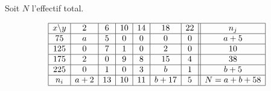 \documentclass[12pt,a4paper]{article}
\begin{document}
\vspace{0.2cm}

Soit \( N \) l’effectif total.

\vspace{0.4cm}

\[
\begin{array}{|c|c|c|c|c|c|c||c|}
\hline
x \backslash y & 2 & 6 & 10 & 14 & 18 & 22 & n_j \\
\hline
75 & a & 5 & 0 & 0 & 0 & 0 & a+5 \\
\hline
125 & 0 & 7 & 1 & 0 & 2 & 0 & 10 \\
\hline
175 & 2 & 0 & 9 & 8 & 15 & 4 & 38 \\
\hline
225 & 0 & 1 & 0 & 3 & b & 1 & b+5 \\
\hline
n_i & a+2 & 13 & 10 & 11 & b+17 & 5 & N = a + b + 58 \\
\hline
\end{array}
\]
\end{document}
